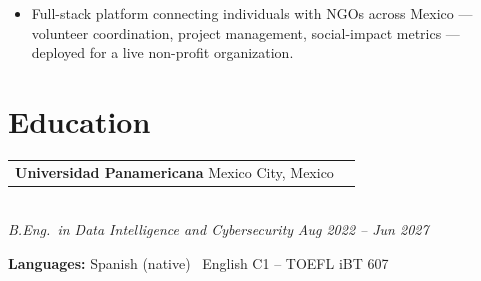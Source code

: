 \documentclass[10pt, letterpaper]{article}
\makeatletter
\newcommand{\entry}[2]{%
  \noindent\begin{tabular*}{\textwidth}{@{}l@{\extracolsep{\fill}}r@{}}
    #1 & #2
  \end{tabular*}}
\newenvironment{cvlist}{%
  \begin{itemize}[leftmargin=1.2em,itemsep=0.5pt,topsep=2pt,parsep=0pt]
}{\end{itemize}}
\makeatother
\begin{document}
\begin{cvlist}
  \item Full-stack platform connecting individuals with NGOs across Mexico ---
        volunteer coordination, project management, social-impact metrics --- deployed
        for a live non-profit organization.
\end{cvlist}

\section{Education}

\entry{\textbf{Universidad Panamericana} \quad Mexico City, Mexico}{}\\
\textit{B.Eng.\ in Data Intelligence and Cybersecurity}
\hfill \textit{Aug 2022 -- Jun 2027}

\medskip

\noindent\textbf{Languages:} Spanish (native) \textbullet\ English C1 -- TOEFL iBT 607
\end{document}
